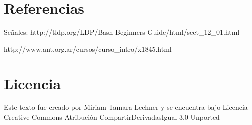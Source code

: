 \documentclass[12pt]{article}
\begin{document}
\section*{Referencias}

Señales: http://tldp.org/LDP/Bash-Beginners-Guide/html/sect\_12\_01.html

http://www.ant.org.ar/cursos/curso\_intro/x1845.html

\section*{Licencia}

Este texto fue creado por Miriam Tamara Lechner y se encuentra bajo 
Licencia Creative Commons Atribución-CompartirDerivadasIgual 3.0 Unported
\end{document}
